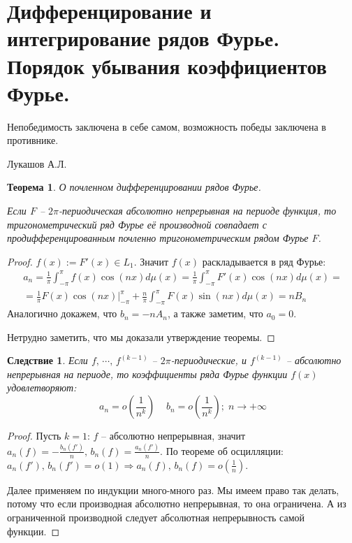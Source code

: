 \documentclass[a4paper,12pt]{article}
\theoremstyle{plain}
\newtheorem{theorem}{Теорема}[section]
\newtheorem*{corollary}{Следствие}
\theoremstyle{definition}
\theoremstyle{remark}
\begin{document}
\section{Дифференцирование и интегрирование рядов Фурье. Порядок убывания коэффициентов Фурье.}

\epigraph{Непобедимость заключена в себе самом, возможность победы заключена в противнике.}{Лукашов А.Л.}

\begin{theorem}
	\label{DIFF_FUR}
	О почленном дифференцировании рядов Фурье.

	Если $F$ -- $2\pi$-периодическая абсолютно непрерывная на периоде функция, то тригонометрический ряд Фурье её производной совпадает с продифференцированным почленно тригонометрическим рядом Фурье $F$.
\end{theorem}

\begin{proof}
	$f(x) := F'(x) \in L_1$. Значит $f(x)$ раскладывается в ряд Фурье:
	\begin{align*}
		a_n = \frac{1}{\pi}\int_{-\pi}^\pi f(x)\cos(nx)d\mu(x) = \frac{1}{\pi}\int_{-\pi}^\pi F'(x)\cos(nx)d\mu(x) = \\
		= \frac{1}{\pi}F(x)\cos(nx)|^\pi_{-\pi} + \frac{n}{\pi} \int_{-\pi}^\pi F(x)\sin(nx)d\mu(x) = nB_n
	\end{align*}
	Аналогично докажем, что $b_n = -nA_n$, а также заметим, что $a_0 = 0$.

	Нетрудно заметить, что мы доказали утверждение теоремы.
\end{proof}

\begin{corollary}
	Если $f,\,\cdots,\,f^{(k-1)}$ -- $2\pi$-периодические, и $f^{(k-1)}$ -- абсолютно непрерывная на периоде, то коэффициенты ряда Фурье функции $f(x)$ удовлетворяют:
	\[a_n = o\left(\frac{1}{n^k}\right)\;\;\;\; b_n = o\left(\frac{1}{n^k}\right);\; n \to +\infty\]
\end{corollary}

\begin{proof}
	Пусть $k = 1$: $f$ -- абсолютно непрерывная, значит $a_n(f) = -\frac{b_n(f')}{n},\, b_n(f) = \frac{a_n(f')}{n}$. По теореме об осцилляции: $a_n(f'),\, b_n(f') = o(1) \Rightarrow a_n(f),\,b_n(f) = o\left(\frac{1}{n}\right)$.

	Далее применяем по индукции много-много раз. Мы имеем право так делать, потому что если производная абсолютно непрерывная, то она ограничена. А из ограниченной производной следует абсолютная непрерывность самой функции.
\end{proof}
\end{document}
